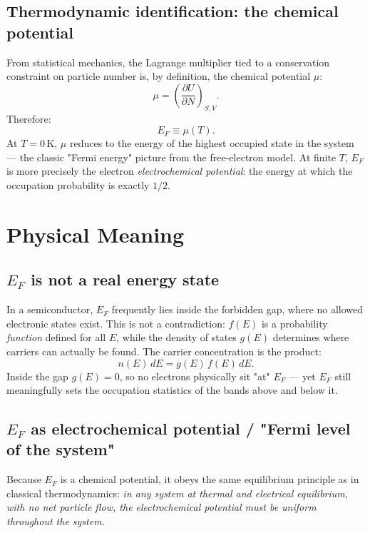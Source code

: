 \documentclass[11pt]{article}
\begin{document}
\subsection{Thermodynamic identification: the chemical potential}

From statistical mechanics, the Lagrange multiplier tied to a conservation constraint on particle number is, by definition, the chemical potential $\mu$:
\begin{equation}
\mu = \left(\frac{\partial U}{\partial N}\right)_{S,V}.
\end{equation}
Therefore:
\begin{equation}
E_F \equiv \mu(T).
\end{equation}
At $T = 0\,\text{K}$, $\mu$ reduces to the energy of the highest occupied state in the system — the classic "Fermi energy" picture from the free-electron model. At finite $T$, $E_F$ is more precisely the electron \emph{electrochemical potential}: the energy at which the occupation probability is exactly $1/2$.

\section{Physical Meaning}

\subsection{$E_F$ is not a real energy state}
In a semiconductor, $E_F$ frequently lies inside the forbidden gap, where no allowed electronic states exist. This is not a contradiction: $f(E)$ is a probability \emph{function} defined for all $E$, while the density of states $g(E)$ determines where carriers can actually be found. The carrier concentration is the product:
\begin{equation}
n(E)\,dE = g(E)\,f(E)\,dE.
\end{equation}
Inside the gap $g(E) = 0$, so no electrons physically sit "at" $E_F$ — yet $E_F$ still meaningfully sets the occupation statistics of the bands above and below it.

\subsection{$E_F$ as electrochemical potential / "Fermi level of the system"}
Because $E_F$ is a chemical potential, it obeys the same equilibrium principle as in classical thermodynamics: \emph{in any system at thermal and electrical equilibrium, with no net particle flow, the electrochemical potential must be uniform throughout the system.}
\end{document}
